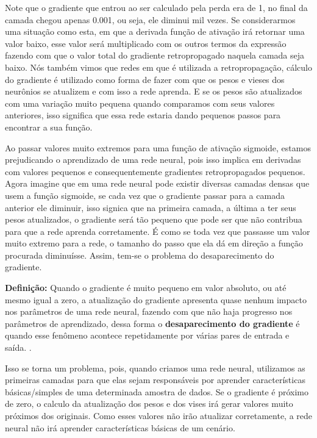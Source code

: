 Note que o gradiente que entrou ao ser calculado pela perda era de 1, no final da camada chegou apenas 0.001, ou seja, ele diminui mil vezes. Se considerarmos uma situação como esta, em que a derivada função de ativação irá retornar uma valor baixo, esse valor será multiplicado com os outros termos da expressão fazendo com que o valor total do gradiente retropropagado naquela camada seja baixo. Nós também vimos que redes em que é utilizada a retropropagação, cálculo do gradiente é utilizado como forma de fazer com que os pesos e vieses dos neurônios se atualizem e com isso a rede aprenda. E se os pesos são atualizados com uma variação muito pequena quando comparamos com seus valores anteriores, isso significa que essa rede estaria dando pequenos passos para encontrar a sua função. 

Ao passar valores muito extremos para uma função de ativação sigmoide, estamos prejudicando o aprendizado de uma rede neural, pois isso implica em derivadas com valores pequenos e consequentemente gradientes retropropagados pequenos. Agora imagine que em uma rede neural pode existir diversas camadas densas que usem a função sigmoide, se cada vez que o gradiente passar para a camada anterior ele diminuir, isso signica que na primeira camada, a última a ter seus pesos atualizados, o gradiente será tão pequeno que pode ser que não contribua para que a rede aprenda corretamente. É como se toda vez que passasse um valor muito extremo para a rede, o tamanho do passo que ela dá em direção a função procurada diminuísse. Assim, tem-se o problema do desaparecimento do gradiente.

\begin{definicaomoderna}{\textbf{Definição:}}
Quando o gradiente é muito pequeno em valor absoluto, ou até mesmo igual a zero, a atualização do gradiente apresenta quase nenhum impacto nos parâmetros de uma rede neural, fazendo com que não haja progresso nos parâmetros de aprendizado, dessa forma o \textbf{desaparecimento do gradiente} é quando esse fenômeno acontece repetidamente por várias pares de entrada e saída. \parencite{ActivationFunctionsLederer}.
\end{definicaomoderna}

Isso se torna um problema, pois, quando criamos uma rede neural, utilizamos as primeiras camadas para que elas sejam responsáveis por aprender características básicas/simples de uma determinada amostra de dados. Se o gradiente é próximo de zero, o calculo da atualização dos pesos e dos vises irá gerar valores muito próximos dos originais. Como esses valores não irão atualizar corretamente, a rede neural não irá aprender características básicas de um cenário.

